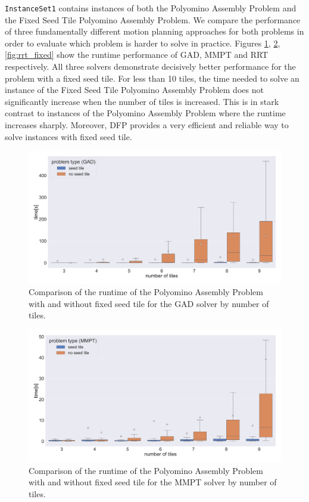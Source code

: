 \texttt{InstanceSet1} contains instances of both the Polyomino Assembly Problem and the Fixed Seed Tile Polyomino Assembly Problem.
We compare the performance of three fundamentally different motion planning approaches for both problems in order to evaluate which problem is harder to solve in practice.
Figures \ref{fig:gad_fixed}, \ref{fig:mmpt_fixed}, \ref{fig:rrt_fixed} show the runtime performance of GAD, MMPT and RRT respectively. All three solvers demonstrate decisively better performance for the problem with a fixed seed tile. For less than 10 tiles, the time needed to solve an instance of the Fixed Seed Tile Polyomino Assembly Problem does not significantly increase when the number of tiles is increased. This is in stark contrast to instances of the Polyomino Assembly Problem where the runtime increases sharply.
Moreover, DFP provides a very efficient and reliable way to solve instances with fixed seed tile.


\begin{figure}[htpb]
\centering
\includegraphics[width=\textwidth]{figures/plots/heuristic_solvers_i1/gad_i1_fixed_time_over_tiles.pdf}
\caption [Runtime comparison by problem type for GAD] {Comparison of the runtime of the Polyomino Assembly Problem with and without fixed seed tile for the GAD solver by number of tiles.}
\label{fig:gad_fixed}
\end{figure}


\begin{figure}[htpb]
\centering
\includegraphics[width=\textwidth]{figures/plots/heuristic_solvers_i1/mmpt_i1_fixed_time_over_tiles.pdf}
\caption[Runtime comparison by problem type for MMPT]{Comparison of the runtime of the Polyomino Assembly Problem with and without fixed seed tile for the MMPT solver by number of tiles.}
\label{fig:mmpt_fixed}
\end{figure}

